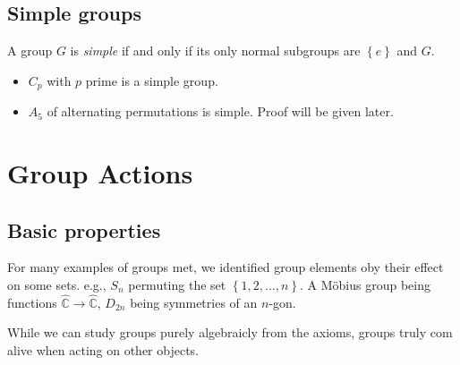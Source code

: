 \documentclass[a4paper]{article}
\begin{document}
    \subsection{Simple groups}
    \begin{definition}
        A group $G$ is \textit{simple} if and only if its only normal subgroups are $ \left\{ e\right\} $ and $G$.
    \end{definition}
    \begin{example}
        \begin{itemize}
            \item $ C_p $ with $p$ prime is a simple group.
            \item $ A_5 $ of alternating permutations is simple. Proof will be given later.
        \end{itemize}
    \end{example}
    \section{Group Actions}
    \subsection{Basic properties}
        For many examples of groups met, we identified group elements oby their effect on some sets. e.g., $S_n$ permuting the set $ \left\{ 1,2,\dots,n\right\} $. A M\"{o}bius group being functions $ \hat{\mathbb{C}}\to \hat{\mathbb{C}} $, $ D_{2n} $ being symmetries of an $n$-gon.

        While we can study groups purely algebraicly from the axioms, groups truly com alive when acting on other objects.
\end{document}
